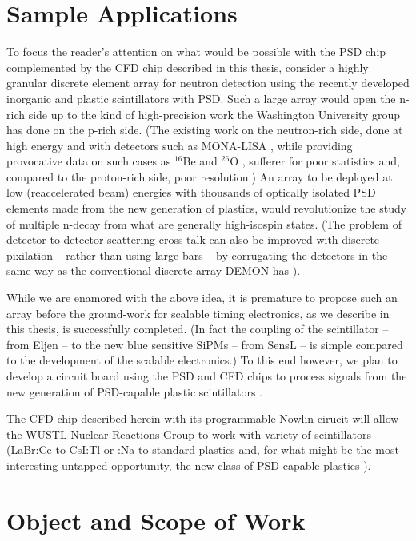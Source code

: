 \documentclass[12pt,oneside,final]{siuethesis}
\theoremstyle{definition}
\begin{document}
\section{Sample Applications}

To focus the reader's attention on what would be possible with the PSD chip complemented by the CFD chip described in this thesis, consider a highly granular discrete element array for neutron detection using the recently developed inorganic \cite{BUDDEN} and plastic \cite{ZAITSEVA} scintillators with PSD. Such a large array would open the n-rich side up to the kind of high-precision work the Washington University group has done on the p-rich side. (The existing work on the neutron-rich side, done at high energy and with detectors such as MONA-LISA \cite{BAUMANNA}, while providing provocative data on such cases as $^{16}\mathrm{Be}$ \cite{SPYROU} and $^{26}\mathrm{O}$ \cite{KOHLEY}, sufferer for poor statistics and, compared to the proton-rich side, poor resolution.) An array to be deployed at low (reaccelerated beam) energies with thousands of optically isolated PSD elements made from the new generation of plastics, would revolutionize the study of multiple n-decay from what are generally high-isospin states. (The problem of detector-to-detector scattering cross-talk can also be improved with discrete pixilation – rather than using large bars – by corrugating the detectors in the same way as the conventional discrete array DEMON has \cite{TILQUIN}).  

While we are enamored with the above idea, it is premature to propose such an array before the ground-work for scalable timing electronics, as we describe in this thesis, is successfully completed. (In fact the coupling of the scintillator – from Eljen – to the new blue sensitive SiPMs – from SensL – is simple compared to the development of the scalable electronics.) To this end however, we plan to develop a circuit board using the PSD and CFD chips to process signals from the new generation of PSD-capable plastic scintillators \cite{ZAITSEVA}. 

The CFD chip described herein with its programmable Nowlin cirucit will allow the WUSTL Nuclear Reactions Group to work with variety of scintillators (LaBr:Ce to CsI:Tl or :Na to standard plastics and, for what might be the most interesting untapped opportunity, the new class of PSD capable plastics \cite{ZAITSEVA}).  


\section{Object and Scope of Work} 
\end{document}
